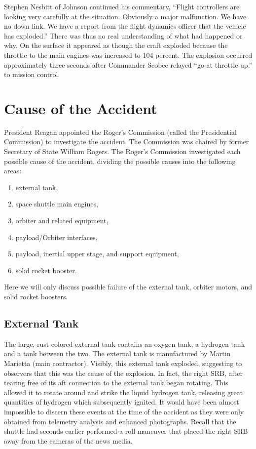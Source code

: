 Stephen Nesbitt of Johnson continued his commentary, ``Flight controllers are looking very carefully at the situation. Obviously a major malfunction. We have no down link. We have a report from the flight dynamics officer that the vehicle has exploded.'' There was thus no real understanding of what had happened or why. On the surface it appeared as though the craft exploded because the throttle to the main engines was increased to 104 percent. The explosion occurred approximately three seconds after Commander Scobee relayed ``go at throttle up.'' to mission control.

\section{Cause of the Accident}

President Reagan appointed the Roger's Commission (called the Presidential Commission) to investigate the accident. The Commission was chaired by former Secretary of State William Rogers. The Roger's Commission investigated each possible cause of the accident, dividing the possible causes into the following areas:

\begin{singlespace}
\begin{enumerate}
\item external tank,
\item space shuttle main engines,
\item orbiter and related equipment,
\item payload/Orbiter interfaces,
\item payload, inertial upper stage, and support equipment,
\item solid rocket booster.
\end{enumerate}
\end{singlespace}

Here we will only discuss possible failure of the external tank, orbiter motors, and solid rocket boosters.

\subsection{External Tank}

The large, rust-colored external tank contains an oxygen tank, a hydrogen tank and a tank between the two. The external tank is manufactured by Martin Marietta (main contractor). Visibly, this external tank exploded, suggesting to observers that this was the cause of the explosion. In fact, the right SRB, after tearing free of its aft connection to the external tank began rotating. This allowed it to rotate around and strike the liquid hydrogen tank, releasing great quantities of hydrogen which subsequently ignited. It would have been almost impossible to discern these events at the time of the accident as they were only obtained from telemetry analysis and enhanced photographs. Recall that the shuttle had seconds earlier performed a roll maneuver that placed the right SRB away from the cameras of the news media.


